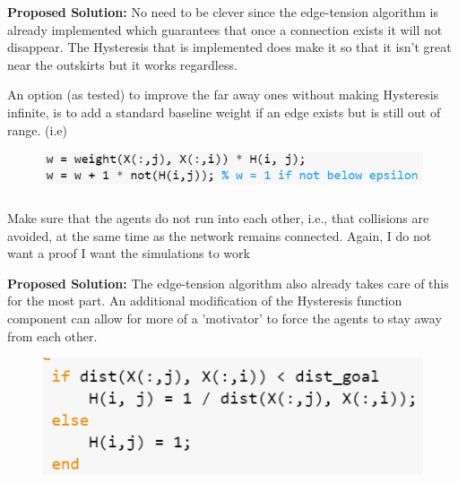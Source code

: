 \documentclass[]{article}
\numberwithin{equation}{section}
\begin{document}
\textbf{Proposed Solution:}
No need to be clever since the edge-tension algorithm is already implemented which guarantees that once a connection exists it will not disappear.
The Hysteresis that is implemented does make it so that it isn't great near the outskirts but it works regardless.

An option (as tested) to improve the far away ones without making Hysteresis infinite, is to add a standard baseline weight if an edge exists but is still out of range. (i.e)
\begin{figure}[h]
    \centering
    \includegraphics[]{figs/pblm6a_code.png}
\end{figure}

\subsubsection{}
Make  sure  that  the  agents  do  not  run  into  each  other,  i.e.,  that  collisions  are avoided, at the same time as the network remains connected. 
Again, I do not want a proof I want the simulations to work

\textbf{Proposed Solution:}
The edge-tension algorithm also already takes care of this for the most part. 
An additional modification of the Hysteresis function component can allow for more of a 'motivator' to force the agents to stay away from each other.
\begin{figure}[h]
    \centering
    \includegraphics[width=0.4 \textwidth]{figs/pblm6b_code.png}
\end{figure}

\newpage
\end{document}
